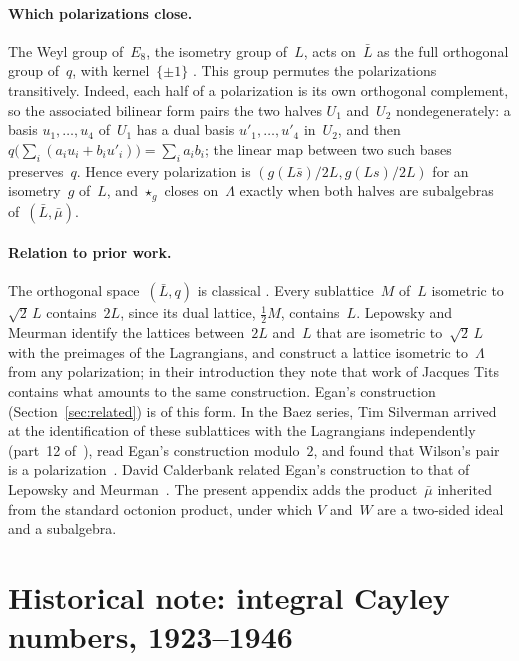 \documentclass[twoside,english]{paper}
\numberwithin{equation}{section}
\numberwithin{figure}{section}
\theoremstyle{definition}
\theoremstyle{remark}
\newcommand{\LL}{\Lambda}             %
\begin{document}
\paragraph{Which polarizations close.}
The Weyl group of~$E_8$, the isometry group of~$L$, acts on~$\bar L$
as the full orthogonal group of~$q$, with kernel~$\{\pm 1\}$
\cite[\S3.12.4]{WilsonBook2009}.  This group permutes the polarizations
transitively.  Indeed, each half of a polarization is its own orthogonal
complement, so the associated bilinear form pairs the two halves
$U_1$ and~$U_2$ nondegenerately: a basis $u_1, \ldots, u_4$ of~$U_1$
has a dual basis $u'_1, \ldots, u'_4$ in~$U_2$, and then
$q\bigl(\sum_i (a_i u_i + b_i u'_i)\bigr) = \sum_i a_i b_i$; the linear
map between two such bases preserves~$q$.  Hence every polarization is
$(g(L\bar s)/2L, g(Ls)/2L)$ for an isometry~$g$ of~$L$, and $\star_g$
closes on~$\LL$ exactly when both halves are subalgebras
of~$(\bar L, \bar\mu)$.

\paragraph{Relation to prior work.}
The orthogonal space~$(\bar L, q)$ is classical
\cite[\S3.12.4]{WilsonBook2009}.  Every sublattice~$M$ of~$L$
isometric to~$\sqrt2\,L$ contains~$2L$, since its dual lattice,
$\tfrac12 M$, contains~$L$.  Lepowsky and Meurman
\cite[\S2]{LepowskyMeurman1982} identify the lattices between~$2L$
and~$L$ that are isometric to~$\sqrt2\,L$ with the preimages of the
Lagrangians, and construct a lattice isometric to~$\LL$ from any
polarization; in their introduction they note that work of Jacques Tits
contains what amounts to the same construction.  Egan's construction (Section~\ref{sec:related}) is
of this form.  In the Baez series, Tim Silverman arrived at the
identification of these sublattices with the Lagrangians independently
(part~12 of~\cite{Baez2014}), read Egan's construction modulo~$2$, and
found that Wilson's pair is a polarization~\cite{Silverman2016}.  David
Calderbank related Egan's construction to that of Lepowsky and
Meurman~\cite{Calderbank2023}.
The present appendix adds the product~$\bar\mu$ inherited from the
standard octonion product, under which $V$ and~$W$ are a two-sided
ideal and a subalgebra.

\section{Historical note: integral Cayley numbers,
1923--1946}\label{app:history}
\end{document}
